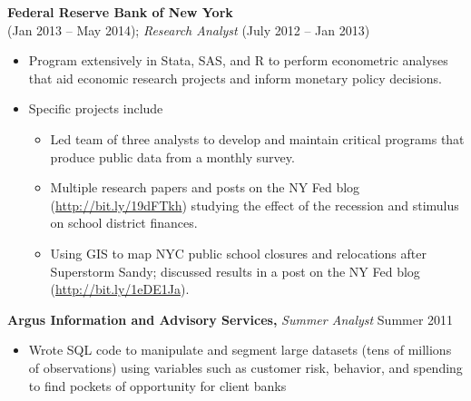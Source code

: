 \documentclass{res}
\begin{document}
\begin{resume}
  {\bf Federal Reserve Bank of New York}  \\
   (Jan 2013 -- May 2014); {\it Research Analyst} (July 2012 -- Jan 2013)
  \begin{itemize} \itemsep 2.0pt %
  \item Program extensively in Stata, SAS, and R to perform econometric analyses that aid economic research projects and inform monetary policy decisions.
  \item Specific projects include
    \setlength{\parskip}{-1.75pt} 
    \begin{itemize}
      \setlength{\itemsep}{1.5pt}
    \item Led team of three analysts to develop and maintain critical programs that produce public data from a monthly survey.
    \item Multiple research papers and posts on the NY Fed blog (\href{http://bit.ly/19dFTkh}{http://bit.ly/19dFTkh}) studying the effect of the recession and stimulus on school district finances.
    \item Using GIS to map NYC public school closures and relocations after Superstorm Sandy; discussed results in a post on the NY Fed blog (\href{http://bit.ly/1eDE1Ja}{http://bit.ly/1eDE1Ja}).
    
    \end{itemize}
  \end{itemize}

  {\bf Argus Information and Advisory Services,} {\it Summer Analyst} \hfill Summer 2011
  \begin{itemize} \itemsep 2.0pt
  \item Wrote SQL code to manipulate and segment large datasets (tens of millions of observations) using variables such as customer risk, behavior, and spending to find pockets of opportunity for client banks
  \end{itemize}


\end{resume}
\end{document}

